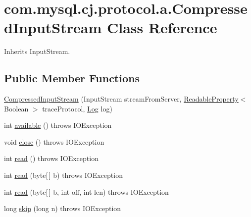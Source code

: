 \hypertarget{classcom_1_1mysql_1_1cj_1_1protocol_1_1a_1_1_compressed_input_stream}{}\section{com.\+mysql.\+cj.\+protocol.\+a.\+Compressed\+Input\+Stream Class Reference}
\label{classcom_1_1mysql_1_1cj_1_1protocol_1_1a_1_1_compressed_input_stream}


Inherits Input\+Stream.

\subsection*{Public Member Functions}
\begin{DoxyCompactItemize}
\item 
\mbox{\hyperlink{classcom_1_1mysql_1_1cj_1_1protocol_1_1a_1_1_compressed_input_stream_aba7d9e3700e281f4098e7b63a1143a46}{Compressed\+Input\+Stream}} (Input\+Stream stream\+From\+Server, \mbox{\hyperlink{interfacecom_1_1mysql_1_1cj_1_1conf_1_1_readable_property}{Readable\+Property}}$<$ Boolean $>$ trace\+Protocol, \mbox{\hyperlink{interfacecom_1_1mysql_1_1cj_1_1log_1_1_log}{Log}} log)
\item 
int \mbox{\hyperlink{classcom_1_1mysql_1_1cj_1_1protocol_1_1a_1_1_compressed_input_stream_a1ff871810891e136ffa3b395ee34e4af}{available}} ()  throws I\+O\+Exception 
\item 
void \mbox{\hyperlink{classcom_1_1mysql_1_1cj_1_1protocol_1_1a_1_1_compressed_input_stream_ae2a7fb47e255d6f525144d85e4267acf}{close}} ()  throws I\+O\+Exception 
\item 
int \mbox{\hyperlink{classcom_1_1mysql_1_1cj_1_1protocol_1_1a_1_1_compressed_input_stream_ab7cb778b77e62b7937557ae73795734c}{read}} ()  throws I\+O\+Exception 
\item 
int \mbox{\hyperlink{classcom_1_1mysql_1_1cj_1_1protocol_1_1a_1_1_compressed_input_stream_afdf745c00f204f70927ceb1543b468e4}{read}} (byte\mbox{[}$\,$\mbox{]} b)  throws I\+O\+Exception 
\item 
int \mbox{\hyperlink{classcom_1_1mysql_1_1cj_1_1protocol_1_1a_1_1_compressed_input_stream_aff0d5a3015ea7bee362c9f17c3653905}{read}} (byte\mbox{[}$\,$\mbox{]} b, int off, int len)  throws I\+O\+Exception 
\item 
long \mbox{\hyperlink{classcom_1_1mysql_1_1cj_1_1protocol_1_1a_1_1_compressed_input_stream_af52c6a22e9a2c960a9bc5b7d5b9a95e7}{skip}} (long n)  throws I\+O\+Exception 
\end{DoxyCompactItemize}


